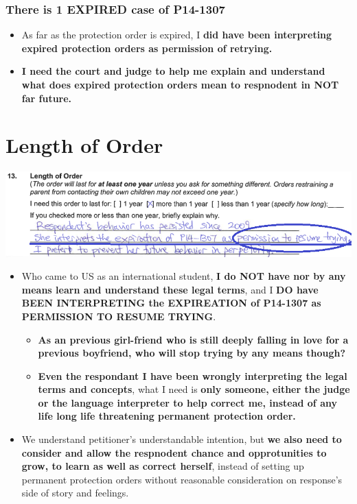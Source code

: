 \documentclass[9pt, b5paper]{article}
\begin{document}
\subsubsection{There is 1 EXPIRED case of \textbf{P14-1307}}
\label{sec-2-1-3}
\begin{itemize}
\item As far as the protection order is expired, I \textbf{did have been interpreting expired protection orders as permission of retrying.}
\item \textbf{I need the court and judge to help me explain and understand what does expired protection orders mean to respnodent in NOT far future.}
\end{itemize}

\section{Length of Order}
\label{sec-3}

\includegraphics[width=.9\linewidth]{./pic/dearCousin_20220919_153711.png}
\begin{itemize}
\item Who came to US as an international student, \textbf{I do NOT have nor by any means learn and understand these legal terms}, and I \textbf{DO have BEEN INTERPRETING the EXPIREATION of P14-1307 as PERMISSION TO RESUME TRYING}. 
\begin{itemize}
\item \textbf{As an previous girl-friend who is still deeply falling in love for a previous boyfriend, who will stop trying by any means though?}
\item \textbf{Even the respondant I have been wrongly interpreting the legal terms and concepts}, what I need is \textbf{only someone, either the judge or the language interpreter to help correct me, instead of any life long life threatening permanent protection order.}
\end{itemize}
\item We understand petitioner's understandable intention, but \textbf{we also need to consider and allow the respnodent chance and opprotunities to grow, to learn as well as correct herself}, instead of setting up permanent protection orders without reasonable consideration on response's side of story and feelings.
\end{itemize}
\end{document}
